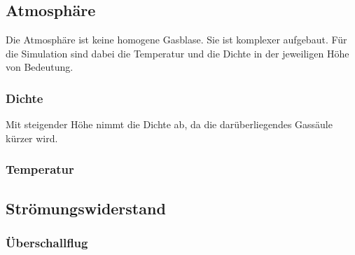 \subsection{Atmosphäre}
Die Atmosphäre ist keine homogene Gasblase.
Sie ist komplexer aufgebaut.
Für die Simulation sind dabei die Temperatur und die Dichte in der jeweiligen Höhe von Bedeutung.

\subsubsection{Dichte}
Mit steigender Höhe nimmt die Dichte ab, da die darüberliegendes Gassäule kürzer wird.


\subsubsection{Temperatur}



\subsection{Strömungswiderstand}

\subsubsection{Überschallflug}



